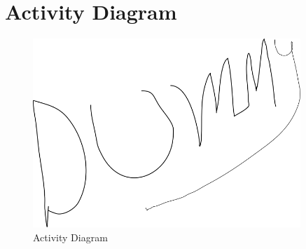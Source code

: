 \clearpage

\section{Activity Diagram}

\begin{figure}[h]
    \centering
    \includegraphics[width=0.9\textwidth]{images/dummy.png}
    \caption{Activity Diagram}
    \label{fig:Activity Diagram}
\end{figure}

\clearpage

